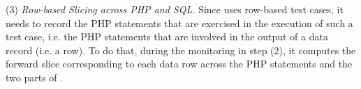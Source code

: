 (3) {\em Row-based Slicing across PHP and SQL.} Since {\tool} uses
row-based test cases, it needs to record the PHP statements that are
exercised in the execution of such a test case, i.e. the PHP
statements that are involved in the output of a data record (i.e. a
row). To do that, during the monitoring in step (2), it computes the
forward slice corresponding to each data row across the PHP statements
and the two parts of .








